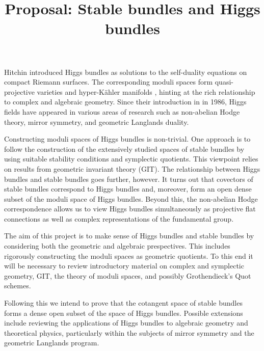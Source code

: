 \documentclass{article}
\title{Proposal: Stable bundles and Higgs bundles}
\begin{document}
Hitchin introduced Higgs bundles as solutions to the self-duality
equations on compact Riemann surfaces. \cite{hitchin1986} The
corresponding moduli spaces form quasi-projective varieties and
hyper-K\"ahler manifolds \cite{mccarthy2020}, hinting at the rich relationship to complex
and algebraic geometry.
Since their
introduction in in 1986, Higgs fields have appeared in various areas  of research such
as non-abelian Hodge theory, mirror symmetry, and geometric Langlands duality.
\cite{bradlow2007}

Constructing moduli spaces of Higgs bundles is non-trivial. One approach
is to follow the construction of the extensively studied spaces of
stable bundles by using suitable stability conditions and symplectic
quotients. This viewpoint relies on results from geometric
invariant theory (GIT). \cite{neitzke2021} The relationship between Higgs bundles and stable
bundles goes further, however. It turns out that covectors of stable
bundles correspond to Higgs bundles and, moreover, form an open
dense subset of the moduli space of Higgs bundles.
Beyond this, the non-abelian Hodge correspondence
allows us to view Higgs bundles simultaneously as projective flat
connections as well as complex representations of the fundamental
group.

The aim of this project is to make sense of Higgs bundles and stable
bundles by considering both the geometric and algebraic prespectives.
This includes rigorously constructing the moduli spaces as geometric
quotients. To this end it will be necessary to review introductory
material on complex and symplectic geometry, GIT, the theory of
moduli spaces, and possibly Grothendieck's Quot schemes.

Following this we intend to prove that the cotangent space of stable bundles
forms a dense open subset of the space of Higgs bundles. Possible extensions
include reviewing the applications of Higgs bundles to algebraic geometry and
theoretical physics, particularly within the subjects of mirror symmetry and
the geometric Langlands program.


\printbibliography
\end{document}
